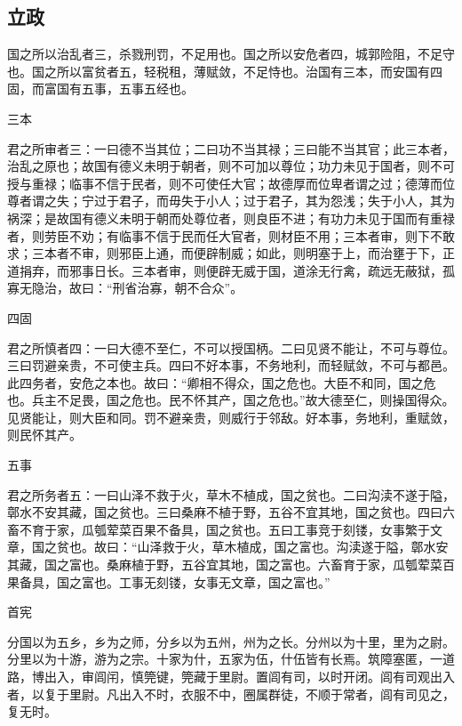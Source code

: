 \documentclass[]{article}
\begin{document}
\hypertarget{header-n47}{%
\subsection{立政}\label{header-n47}}

国之所以治乱者三，杀戮刑罚，不足用也。国之所以安危者四，城郭险阻，不足守也。国之所以富贫者五，轻税租，薄赋敛，不足恃也。治国有三本，而安国有四固，而富国有五事，五事五经也。

三本

君之所审者三：一曰德不当其位；二曰功不当其禄；三曰能不当其官；此三本者，治乱之原也；故国有德义未明于朝者，则不可加以尊位；功力未见于国者，则不可授与重禄；临事不信于民者，则不可使任大官；故德厚而位卑者谓之过；德薄而位尊者谓之失；宁过于君子，而毋失于小人；过于君子，其为怨浅；失于小人，其为祸深；是故国有德义未明于朝而处尊位者，则良臣不进；有功力未见于国而有重禄者，则劳臣不劝；有临事不信于民而任大官者，则材臣不用；三本者审，则下不敢求；三本者不审，则邪臣上通，而便辟制威；如此，则明塞于上，而治壅于下，正道捐弃，而邪事日长。三本者审，则便辟无威于国，道涂无行禽，疏远无蔽狱，孤寡无隐治，故曰：``刑省治寡，朝不合众''。

四固

君之所慎者四：一曰大德不至仁，不可以授国柄。二曰见贤不能让，不可与尊位。三曰罚避亲贵，不可使主兵。四曰不好本事，不务地利，而轻赋敛，不可与都邑。此四务者，安危之本也。故曰：``卿相不得众，国之危也。大臣不和同，国之危也。兵主不足畏，国之危也。民不怀其产，国之危也。''故大德至仁，则操国得众。见贤能让，则大臣和同。罚不避亲贵，则威行于邻敌。好本事，务地利，重赋敛，则民怀其产。

五事

君之所务者五：一曰山泽不救于火，草木不植成，国之贫也。二曰沟渎不遂于隘，鄣水不安其藏，国之贫也。三曰桑麻不植于野，五谷不宜其地，国之贫也。四曰六畜不育于家，瓜瓠荤菜百果不备具，国之贫也。五曰工事竞于刻镂，女事繁于文章，国之贫也。故曰：``山泽救于火，草木植成，国之富也。沟渎遂于隘，鄣水安其藏，国之富也。桑麻植于野，五谷宜其地，国之富也。六畜育于家，瓜瓠荤菜百果备具，国之富也。工事无刻镂，女事无文章，国之富也。''

首宪

分国以为五乡，乡为之师，分乡以为五州，州为之长。分州以为十里，里为之尉。分里以为十游，游为之宗。十家为什，五家为伍，什伍皆有长焉。筑障塞匿，一道路，博出入，审闾闬，慎筦键，筦藏于里尉。置闾有司，以时开闭。闾有司观出入者，以复于里尉。凡出入不时，衣服不中，圈属群徒，不顺于常者，闾有司见之，复无时。
\end{document}
